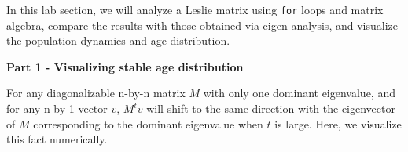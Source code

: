 \documentclass[
]{book}
\newenvironment{Shaded}{\begin{snugshade}}{\end{snugshade}}
\newcommand{\AttributeTok}[1]{\textcolor[rgb]{0.13,0.29,0.53}{#1}}
\newcommand{\ControlFlowTok}[1]{\textcolor[rgb]{0.13,0.29,0.53}{\textbf{#1}}}
\newcommand{\DecValTok}[1]{\textcolor[rgb]{0.00,0.00,0.81}{#1}}
\newcommand{\FloatTok}[1]{\textcolor[rgb]{0.00,0.00,0.81}{#1}}
\newcommand{\FunctionTok}[1]{\textcolor[rgb]{0.13,0.29,0.53}{\textbf{#1}}}
\newcommand{\NormalTok}[1]{#1}
\newcommand{\OtherTok}[1]{\textcolor[rgb]{0.56,0.35,0.01}{#1}}
\newcommand{\SpecialCharTok}[1]{\textcolor[rgb]{0.81,0.36,0.00}{\textbf{#1}}}
\begin{document}
In this lab section, we will analyze a Leslie matrix using \texttt{for} loops and matrix algebra, compare the results with those obtained via eigen-analysis, and visualize the population dynamics and age distribution.

\textbf{Part 1 - Visualizing stable age distribution}

For any diagonalizable n-by-n matrix \(M\) with only one dominant eigenvalue, and for any n-by-1 vector \(v\), \(M^tv\) will shift to the same direction with the eigenvector of \(M\) corresponding to the dominant eigenvalue when \(t\) is large. Here, we visualize this fact numerically.

\begin{Shaded}
\end{Shaded}
\end{document}
